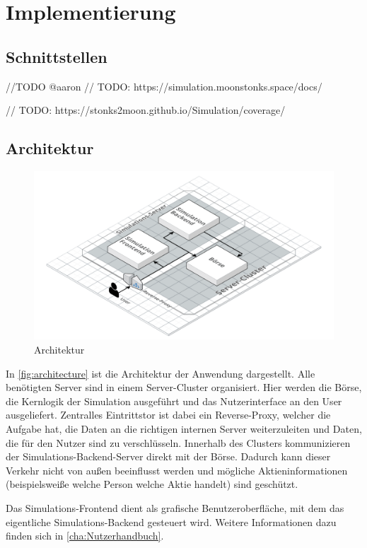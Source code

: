 \chapter{Implementierung}

\section{Schnittstellen}
//TODO @aaron
// TODO: https://simulation.moonstonks.space/docs/

// TODO: https://stonks2moon.github.io/Simulation/coverage/

\section{Architektur}\label{sec:Architektur}
\begin{figure}[ht]
    \includegraphics[width=\textwidth]{img/architecture.png}
    \centering
    \caption{Architektur}
    \label{fig:architecture}
\end{figure}

In \autoref{fig:architecture} ist die Architektur der Anwendung dargestellt.
Alle benötigten Server sind in einem Server-Cluster organisiert.
Hier werden die Börse, die Kernlogik der Simulation ausgeführt und das Nutzerinterface an den User ausgeliefert. Zentralles Eintrittstor ist dabei ein Reverse-Proxy, welcher die Aufgabe hat, die Daten an die richtigen internen Server weiterzuleiten und Daten, die für den Nutzer sind zu verschlüsseln.
Innerhalb des Clusters kommunizieren der Simulations-Backend-Server direkt mit der Börse. Dadurch kann dieser Verkehr nicht von außen beeinflusst werden und mögliche Aktieninformationen (beispielsweiße welche Person welche Aktie handelt) sind geschützt.

Das Simulations-Frontend dient als grafische Benutzeroberfläche, mit dem das eigentliche Simulations-Backend gesteuert wird. Weitere Informationen dazu finden sich in \autoref{cha:Nutzerhandbuch}.

